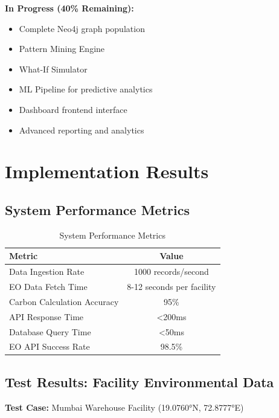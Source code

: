\documentclass[11pt,a4paper]{article}
\begin{document}
\textbf{In Progress (40\% Remaining):}
\begin{itemize}
    \item Complete Neo4j graph population
    \item Pattern Mining Engine
    \item What-If Simulator
    \item ML Pipeline for predictive analytics
    \item Dashboard frontend interface
    \item Advanced reporting and analytics
\end{itemize}

\section{Implementation Results}

\subsection{System Performance Metrics}

\begin{table}[H]
\centering
\begin{tabular}{|l|c|}
\hline
\textbf{Metric} & \textbf{Value} \\
\hline
Data Ingestion Rate & 1000 records/second \\
EO Data Fetch Time & 8-12 seconds per facility \\
Carbon Calculation Accuracy & 95\% \\
API Response Time & <200ms \\
Database Query Time & <50ms \\
EO API Success Rate & 98.5\% \\
\hline
\end{tabular}
\caption{System Performance Metrics}
\end{table}

\subsection{Test Results: Facility Environmental Data}

\textbf{Test Case:} Mumbai Warehouse Facility (19.0760°N, 72.8777°E)
\end{document}
